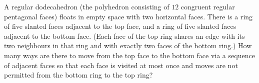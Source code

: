 A regular dodecahedron (the polyhedron consisting of $12$ congruent regular pentagonal faces) floats in empty space with two horizontal faces. There is a ring of five slanted faces adjacent to the top face, and a ring of five slanted faces adjacent to the bottom face. (Each face of the top ring shares an edge with its two neighbours in that ring and with exactly two faces of the bottom ring.) How many ways are there to move from the top face to the bottom face via a sequence of adjacent faces so that each face is visited at most once and moves are not permitted from the bottom ring to the top ring?
